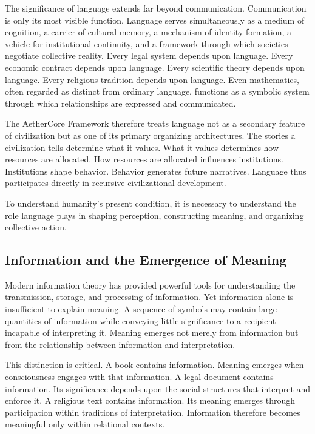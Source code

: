 \documentclass[12pt]{article}
\begin{document}
The significance of language extends far beyond communication. Communication is only its most visible function. Language serves simultaneously as a medium of cognition, a carrier of cultural memory, a mechanism of identity formation, a vehicle for institutional continuity, and a framework through which societies negotiate collective reality. Every legal system depends upon language. Every economic contract depends upon language. Every scientific theory depends upon language. Every religious tradition depends upon language. Even mathematics, often regarded as distinct from ordinary language, functions as a symbolic system through which relationships are expressed and communicated.

The AetherCore Framework therefore treats language not as a secondary feature of civilization but as one of its primary organizing architectures. The stories a civilization tells determine what it values. What it values determines how resources are allocated. How resources are allocated influences institutions. Institutions shape behavior. Behavior generates future narratives. Language thus participates directly in recursive civilizational development.

To understand humanity's present condition, it is necessary to understand the role language plays in shaping perception, constructing meaning, and organizing collective action.


\subsection{Information and the Emergence of Meaning}

Modern information theory has provided powerful tools for understanding the transmission, storage, and processing of information. Yet information alone is insufficient to explain meaning. A sequence of symbols may contain large quantities of information while conveying little significance to a recipient incapable of interpreting it. Meaning emerges not merely from information but from the relationship between information and interpretation.

This distinction is critical. A book contains information. Meaning emerges when consciousness engages with that information. A legal document contains information. Its significance depends upon the social structures that interpret and enforce it. A religious text contains information. Its meaning emerges through participation within traditions of interpretation. Information therefore becomes meaningful only within relational contexts.
\end{document}
